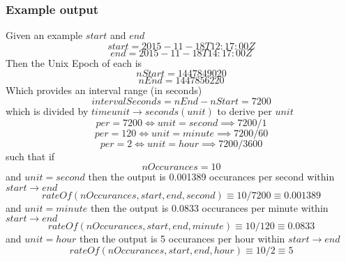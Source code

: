 \documentclass[../main.tex]{subfiles}
\begin{document}
\subsubsection{Example output}
Given an example $start$ and $end$
$$start = 2015-11-18T12:17:00Z$$
$$end = 2015-11-18T14:17:00Z$$
Then the Unix Epoch of each is
$$nStart = 1447849020$$
$$nEnd = 1447856220$$
Which provides an interval range (in seconds)
$$intervalSeconds = nEnd - nStart = 7200$$
which is divided by $timeunit \to seconds(unit)$ to derive per $unit$
$$per = 7200 \iff unit = second \implies 7200 / 1$$
$$per = 120 \iff unit = minute \implies 7200 / 60$$
$$per = 2 \iff unit = hour \implies 7200 / 3600$$
such that if
$$nOccurances = 10$$
and $unit = second$ then the output is 0.001389 occurances per second within $start \to end$
$$rateOf(nOccurances, start, end, second) \equiv 10 / 7200 \equiv 0.001389$$
and $unit = minute$ then the output is 0.0833 occurances per minute within $start \to end$
$$rateOf(nOccurances, start, end, minute) \equiv 10 / 120 \equiv 0.0833$$
and $unit = hour$ then the output is 5 occurances per hour within $start \to end$
$$rateOf(nOccurances, start, end, hour) \equiv 10 / 2 \equiv 5$$
\end{document}
